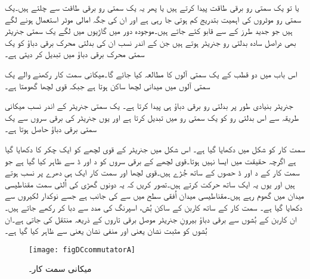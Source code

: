  یا تو یک سمتی رو برقی طاقت پیدا کرتے ہیں یا پھر یہ یک سمتی رو برقی طاقت سے چلتے ہیں۔یک سمتی رو موٹروں کی اہمیت بتدریج کم ہوتی جا رہی ہے اور ان کی جگہ امالی موٹر استعمال ہونے لگے ہیں جو جدید طرز کے  سے قابو کئے جاتے ہیں۔موجودہ دور میں گاڑیوں میں لگے یک سمتی جنریٹر بھی دراصل سادہ بدلتی رو جنریٹر ہوتے ہیں جن کے اندر نسب  ان کی بدلتی محرک برقی دباؤ کو یک سمتی محرک برقی دباؤ میں تبدیل کر دیتی ہے۔

اس باب میں دو قطب کے یک سمتی آلوں کا مطالعہ کیا جائے گا۔میکانی سمت کار رکھنے والے یک سمتی آلوں میں میدانی لچھا ساکن ہوتا ہے جبکہ قوی لچھا گھومتا ہے۔

جنریٹر بنیادی طور پر بدلتی رو برقی دباؤ ہی پیدا کرتا ہے۔ یک سمتی جنریٹر کے اندر نسب   میکانی طریقہ سے اس بدلتی رو کو یک سمتی رو میں تبدیل کرتا ہے اور یوں جنریٹر کی برقی سروں سے یک سمتی برقی دباؤ حاصل ہوتا ہے۔

سمت کار کو شکل   میں دکھایا گیا ہے۔ اس شکل میں جنریٹر کے قوی  لچھے کو ایک چکر کا دکھایا گیا ہے اگرچہ حقیقت میں ایسا نہیں ہوتا۔قوی لچھے کے برقی سروں کو د اور ڈ سے ظاہر کیا گیا ہے جو سمت کار کے د اور ڈ حصوں کے ساتھ جُڑے ہیں۔قوی لچھا اور سمت کار ایک ہی دھرے پر نسب ہوتے ہیں اور یوں یہ ایک ساتھ حرکت کرتے ہیں۔تصور کریں کہ یہ دونوں گھڑی کی اُلٹی سمت مقناطیسی میدان میں گھوم رہے ہیں۔مقناطیسی میدان  اُفقی سطح میں  سے  کی جانب ہے جسے نوکدار لکیروں سے دکھایا گیا ہے۔ سمت کار کے ساتھ کاربن کے ساکن بُش، اسپرنگ کی مدد سے دبا کر رکھے جاتے ہیں۔ان کاربن کے بُشوں سے برقی دباؤ بیرونِ جنریٹر موصل برقی تاروں کے ذریعہ منتقل کی جاتی ہے۔ان بُشوں کو مثبت نشان یعنی   اور منفی نشان یعنی  سے ظاہر کیا گیا ہے۔
\begin{figure}
\centering
\texttt{[image: figDCcommutatorA]}
\caption{میکانی سمت کار۔}
\label{شکل_یکسمتی_میکانی_سمتکار}
\end{figure}

